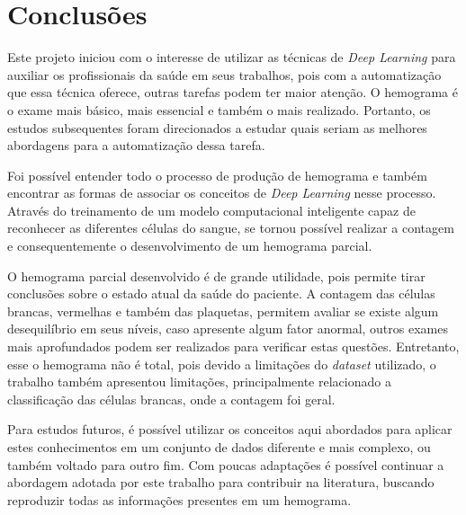 \chapter{Conclusões}
\label{chap:conclusoes}

Este projeto iniciou com o interesse de utilizar as técnicas de \emph{Deep Learning} para auxiliar os profissionais da saúde em seus trabalhos, pois com a automatização que essa técnica oferece, outras tarefas podem ter maior atenção. O hemograma é o exame mais básico, mais essencial e também o mais realizado. Portanto, os estudos subsequentes foram direcionados a estudar quais seriam as melhores abordagens para a automatização dessa tarefa.

Foi possível entender todo o processo de produção de hemograma e também encontrar as formas de associar os conceitos de \emph{Deep Learning} nesse processo. Através do treinamento de um modelo computacional inteligente capaz de reconhecer as diferentes células do sangue, se tornou possível realizar a contagem e consequentemente o desenvolvimento de um hemograma parcial.

O hemograma parcial desenvolvido é de grande utilidade, pois permite tirar conclusões sobre o estado atual da saúde do paciente. A contagem das células brancas, vermelhas e também das plaquetas, permitem avaliar se existe algum desequilíbrio em seus níveis, caso apresente algum fator anormal, outros exames mais aprofundados podem ser realizados para verificar estas questões. Entretanto, esse o hemograma não é total, pois devido a limitações do \emph{dataset} utilizado, o trabalho também apresentou limitações, principalmente relacionado a classificação das células brancas, onde a contagem foi geral.

Para estudos futuros, é possível utilizar os conceitos aqui abordados para aplicar estes conhecimentos em um conjunto de dados diferente e mais complexo, ou também voltado para outro fim. Com poucas adaptações é possível continuar a abordagem adotada por este trabalho para contribuir na literatura, buscando reproduzir todas as informações presentes em um hemograma.
